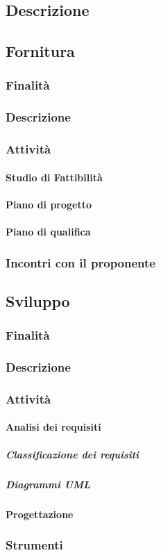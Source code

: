 \documentclass[../norme-di-progetto.tex]{subfiles}
\begin{document}
\subsection{Descrizione}
\subsection{Fornitura}
\subsubsection{Finalità}
\subsubsection{Descrizione}
\subsubsection{Attività}
\paragraph{Studio di Fattibilità}
\paragraph{Piano di progetto}
\paragraph{Piano di qualifica}
\subsubsection{Incontri con il proponente}
\subsection{Sviluppo}
\subsubsection{Finalità}
\subsubsection{Descrizione}
\subsubsection{Attività}
\paragraph{Analisi dei requisiti}
\subparagraph{Classificazione dei requisiti}
\subparagraph{Diagrammi UML}
\paragraph{Progettazione}
\subsubsection{Strumenti}
\end{document}
